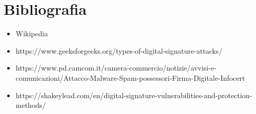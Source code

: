 \chapter{Bibliografia}

\begin{itemize}
	\item Wikipedia
	\item https://www.geeksforgeeks.org/types-of-digital-signature-attacks/
	\item https://www.pd.camcom.it/camera-commercio/notizie/avvisi-e-comunicazioni/Attacco-Malware-Spam-possessori-Firma-Digitale-Infocert
	\item https://shakeylead.com/en/digital-signature-vulnerabilities-and-protection-methods/
\end{itemize}